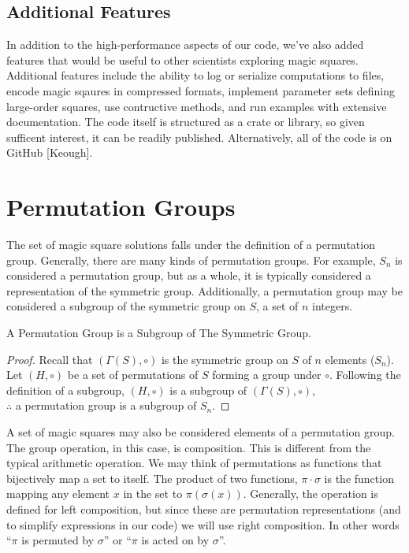 \documentclass{rhumj_new}
\begin{document}
\subsection{Additional Features}

In addition to the high-performance aspects of our code, we've also added features that would
be useful to other scientists exploring magic squares. Additional features include the ability to
log or serialize computations to files, encode magic sqaures in compressed formats, implement
parameter sets defining large-order squares, use contructive methods, and run examples with
extensive documentation. The code itself is structured as a crate or library, so given sufficent
interest, it can be readily published. Alternatively, all of the code is on GitHub [Keough].

\section{Permutation Groups}

The set of magic square solutions falls under the definition of a permutation group.
Generally, there are many kinds of permutation groups. For example, $S_n$ is considered a
permutation group, but as a whole, it is typically considered a representation of the symmetric
group. Additionally, a permutation group may be considered a subgroup of the symmetric group on $S$,
a set of $n$ integers.

\begin{thm} A Permutation Group is a Subgroup of The Symmetric Group.
\end{thm}\label{thmperm}

\begin{proof}
  Recall that $\left(\varGamma\left(S\right), \circ \right)$ is the symmetric group on $S$ of $n$
    elements ($S_n$). Let $\left(H,\circ\right)$ be a set of permutations of $S$ forming a group
    under
    $\circ$. Following the definition of a subgroup, $\left(H,\circ\right)$ is a subgroup of
    $\left(\varGamma\left(S\right), \circ \right)$,\\ $\therefore$ a permutation group is a
    subgroup of
    $S_n$.
\end{proof}

A set of magic squares may also be considered elements of a permutation group. The group
operation, in this case, is composition. This is different from the typical arithmetic operation.
We may think of permutations as functions that bijectively map a set to itself. The product of two
functions, $\pi\cdot\sigma$ is the function mapping any element $x$ in the set to
$\pi\left(\sigma\left(x\right)\right)$. Generally, the operation is defined for left composition,
but since these are permutation representations (and to simplify expressions in our code) we will
use right composition. In other words ``$\pi$ is permuted by $\sigma$'' or ``$\pi$ is acted on by
$\sigma$''.
\end{document}
